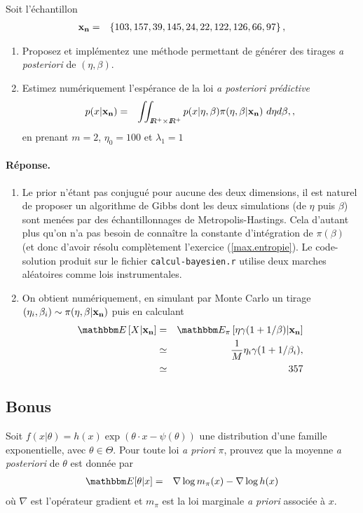 Soit l'échantillon
\begin{eqnarray*}
{\bf x_n} & = & \left\{ 103, 157 , 39 ,145 , 24  ,22 ,122, 126 , 66 , 97\right\},
\end{eqnarray*}
\begin{enumerate}
\item Proposez et implémentez une méthode permettant de générer des tirages {\it a posteriori} de $(\eta,\beta)$. 
\item Estimez numériquement l'espérance de la loi {\it a posteriori prédictive} 
\begin{eqnarray*}
p(x|{\bf x_n}) & = & \iint_{I\!\!R^+\times I\!\!R^+} p(x|\eta,\beta) \pi(\eta,\beta|{\bf x_n}) \ d\eta d\beta,,
\end{eqnarray*}
 en prenant $m=2$, $\eta_0=100$ et $\lambda_1=1$ 
\end{enumerate}

\paragraph{\bf Réponse.} 
\begin{enumerate}
\item Le prior n'étant pas conjugué pour aucune des deux dimensions, il est naturel de proposer un algorithme de Gibbs dont les deux simulations (de $\eta$ puis $\beta$) sont menées par des échantillonnages de Metropolis-Hastings. Cela d'autant plus qu'on n'a pas besoin de connaître la constante d'intégration de $\pi(\beta)$ (et donc d'avoir résolu complètement l'exercice (\ref{max.entropie}).  Le code-solution produit sur le fichier \texttt{calcul-bayesien.r} utilise deux marches aléatoires comme lois instrumentales. 
\item On obtient numériquement, en simulant par Monte Carlo un tirage $(\eta_i,\beta_i)\sim \pi(\eta,\beta|{\bf x_n})$ puis en calculant \begin{eqnarray*}
\E\left[X|{\bf x_n}\right] & = & \E_{\pi}\left[\eta\gamma(1+1/\beta)|{\bf x_n}\right] \\
& \simeq & \frac{1}{M} \eta_i\gamma(1+1/\beta_i), \\
&  \simeq & 357
\end{eqnarray*}
\end{enumerate}

\subsection{Bonus}

Soit $f(x|\theta) = h(x)\exp\left(\theta\cdot x - \psi(\theta)\right)$ une distribution d'une famille exponentielle, avec $\theta\in\Theta$. Pour toute loi {\it a priori} $\pi$, prouvez que la moyenne {\it a posteriori} de $\theta$ est donnée par
\begin{eqnarray*}
\E[\theta|x] & = & \nabla \log m_{\pi}(x) - \nabla \log h(x)
\end{eqnarray*}
où $\nabla$ est l'opérateur gradient et $m_{\pi}$ est la loi marginale {\it a priori} associée à $x$.

